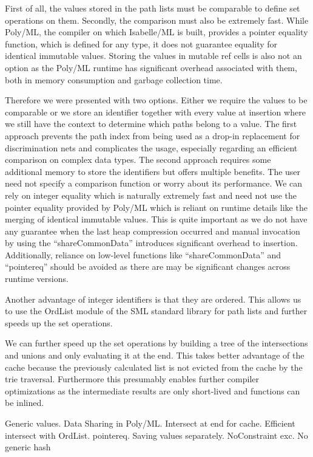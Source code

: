 First of all, the values stored in the path lists must be comparable to define set operations on them. Secondly, the comparison must also be extremely fast. While Poly/ML, the compiler on which Isabelle/ML is built, provides a pointer equality function, which is defined for any type, it does not guarantee equality for identical immutable values. Storing the values in mutable ref cells is also not an option as the Poly/ML runtime has significant overhead associated with them, both in memory consumption and garbage collection time.

Therefore we were presented with two options. Either we require the values to be comparable or we store an identifier together with every value at insertion where we still have the context to determine which paths belong to a value. The first approach prevents the path index from being used as a drop-in replacement for discrimination nets and complicates the usage, especially regarding an efficient comparison on complex data types. The second approach requires some additional memory to store the identifiers but offers multiple benefits. The user need not specify a comparison function or worry about its performance. We can rely on integer equality which is naturally extremely fast and need not use the pointer equality provided by Poly/ML which is reliant on runtime details like the merging of identical immutable values. This is quite important as we do not have any guarantee when the last heap compression occurred and manual invocation by using the ``shareCommonData'' introduces significant overhead to insertion. Additionally, reliance on low-level functions like ``shareCommonData'' and ``pointereq'' should be avoided as there are may be significant changes across runtime versions.

Another advantage of integer identifiers is that they are ordered. This allows us to use the OrdList module of the SML standard library for path lists and further speeds up the set operations.

We can further speed up the set operations by building a tree of the intersections and unions and only evaluating it at the end. This takes better advantage of the cache because the previously calculated list is not evicted from the cache by the trie traversal. Furthermore this presumably enables further compiler optimizations as the intermediate results are only short-lived and functions can be inlined.

Generic values.
Data Sharing in Poly/ML. Intersect at end for cache. Efficient intersect with OrdList. pointereq. Saving values separately. NoConstraint exc. No generic hash
